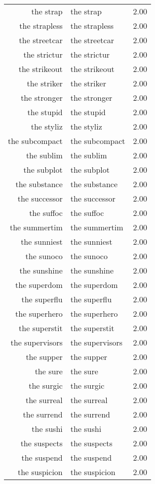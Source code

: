 \begin{table}[ht]
\begin{tabular}{rlr}
  the strap & the strap & 2.00 \\ 
  the strapless & the strapless & 2.00 \\ 
  the streetcar & the streetcar & 2.00 \\ 
  the strictur & the strictur & 2.00 \\ 
  the strikeout & the strikeout & 2.00 \\ 
  the striker & the striker & 2.00 \\ 
  the stronger & the stronger & 2.00 \\ 
  the stupid & the stupid & 2.00 \\ 
  the styliz & the styliz & 2.00 \\ 
  the subcompact & the subcompact & 2.00 \\ 
  the sublim & the sublim & 2.00 \\ 
  the subplot & the subplot & 2.00 \\ 
  the substance & the substance & 2.00 \\ 
  the successor & the successor & 2.00 \\ 
  the suffoc & the suffoc & 2.00 \\ 
  the summertim & the summertim & 2.00 \\ 
  the sunniest & the sunniest & 2.00 \\ 
  the sunoco & the sunoco & 2.00 \\ 
  the sunshine & the sunshine & 2.00 \\ 
  the superdom & the superdom & 2.00 \\ 
  the superflu & the superflu & 2.00 \\ 
  the superhero & the superhero & 2.00 \\ 
  the superstit & the superstit & 2.00 \\ 
  the supervisors & the supervisors & 2.00 \\ 
  the supper & the supper & 2.00 \\ 
  the sure & the sure & 2.00 \\ 
  the surgic & the surgic & 2.00 \\ 
  the surreal & the surreal & 2.00 \\ 
  the surrend & the surrend & 2.00 \\ 
  the sushi & the sushi & 2.00 \\ 
  the suspects & the suspects & 2.00 \\ 
  the suspend & the suspend & 2.00 \\ 
  the suspicion & the suspicion & 2.00 \\ 

\end{tabular}
\end{table}

